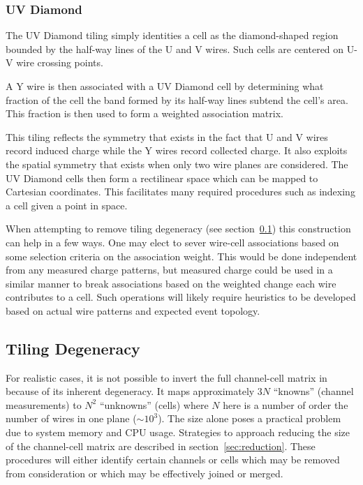 \documentclass[letter]{article}
\begin{document}
\subsubsection{UV Diamond}

The UV Diamond tiling simply identities a cell as the diamond-shaped
region bounded by the half-way lines of the U and V wires.
Such cells are centered on U-V wire crossing points.

A Y wire is then associated with a UV Diamond cell by determining what
fraction of the cell the band formed by its half-way lines subtend the
cell's area.
This fraction is then used to form a weighted association matrix.

This tiling reflects the symmetry that exists in the fact
that U and V wires record induced charge while the Y wires record
collected charge.
It also exploits the spatial symmetry that exists when only two wire
planes are considered.
The UV Diamond cells then form a rectilinear space which can be mapped
to Cartesian coordinates.
This facilitates many required procedures such as indexing a cell
given a point in space.

When attempting to remove tiling degeneracy (see
section~\ref{subsec:tilingdegeneracy}) this construction can help in a
few ways.
One may elect to sever wire-cell associations based on some selection
criteria on the association weight.
This would be done independent from any measured charge patterns, but
measured charge could be used in a similar manner to break
associations based on the weighted change each wire contributes to a cell.
Such operations will likely require heuristics to be developed based
on actual wire patterns and expected event topology.


\subsection{Tiling Degeneracy}
\label{subsec:tilingdegeneracy}

For realistic cases, it is not possible to invert the full
channel-cell matrix in because of its inherent degeneracy.
It maps approximately $3N$ ``knowns'' (channel measurements) to $N^2$
``unknowns'' (cells) where $N$ here is a number of order the number of
wires in one plane ($\sim 10^3$).
The size alone poses a practical problem due to system memory and CPU
usage.
Strategies to approach reducing the size of the channel-cell matrix
are described in section~\ref{sec:reduction}.
These procedures will either identify certain channels or cells which
may be removed from consideration or which may be effectively joined
or merged.
\end{document}
